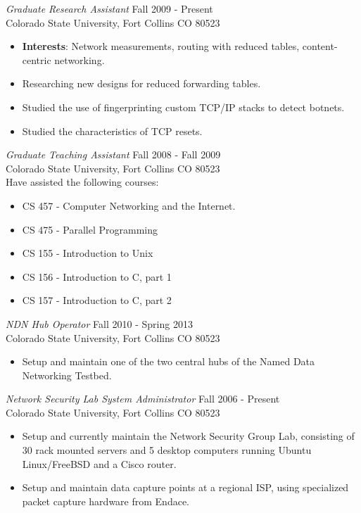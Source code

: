 \documentclass[line,margin]{res}
\begin{document}
\begin{resume}
    {\sl Graduate Research Assistant} \hfill Fall 2009 - Present\\
        Colorado State University, Fort Collins CO 80523
        \begin{itemize}  \itemsep -2pt
				\item {\bf Interests}: Network measurements, routing with reduced tables, content-centric networking.
            \item Researching new designs for reduced forwarding tables.
            \item Studied the use of fingerprinting custom TCP/IP stacks to detect botnets.
            \item Studied the characteristics of TCP resets.
        \end{itemize}

   {\sl Graduate Teaching Assistant} \hfill Fall 2008 - Fall 2009\\
        Colorado State University, Fort Collins CO 80523\\
        Have assisted the following courses:
        \begin{itemize}  \itemsep -2pt
            \item CS 457 - Computer Networking and the Internet.
            \item CS 475 - Parallel Programming
            \item CS 155 - Introduction to Unix
            \item CS 156 - Introduction to C, part 1
            \item CS 157 - Introduction to C, part 2
         \end{itemize}

    {\sl NDN Hub Operator} \hfill {Fall 2010 - Spring 2013}\\
     	Colorado State University, Fort Collins CO 80523
	\begin{itemize} \itemsep -2pt
		\item Setup and maintain one of the two central hubs of the Named Data
		Networking Testbed.
	\end{itemize}

    {\sl Network Security Lab System Administrator} \hfill Fall 2006 - Present\\
        Colorado State University, Fort Collins CO 80523
        \begin{itemize} \itemsep -2pt
            \item Setup and currently maintain the Network Security Group Lab,
            consisting of 30 rack mounted servers and 5 desktop computers
            running Ubuntu Linux/FreeBSD and a Cisco router.
            \item Setup and maintain data capture points at a regional ISP, using
            specialized packet capture hardware from Endace.
        \end{itemize}


\end{resume}
\end{document}
